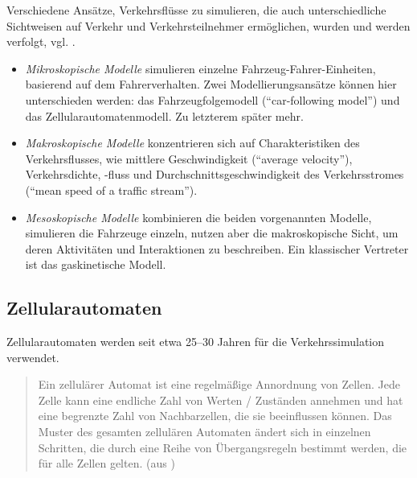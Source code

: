 Verschiedene Ansätze, Verkehrsflüsse zu simulieren, die auch unterschiedliche Sichtweisen auf Verkehr und Verkehrsteilnehmer ermöglichen, %
wurden und werden verfolgt, vgl. \cite{dingding}.
\begin{itemize}
	\item \textit{Mikroskopische Modelle} simulieren einzelne Fahrzeug-Fahrer-Einheiten, basierend auf dem Fahrerverhalten. Zwei Modellierungsansätze können hier unterschieden werden: das Fahrzeugfolgemodell (\enquote{car-following model}) und das Zellularautomatenmodell. Zu letzterem später mehr.
	\item \textit{Makroskopische Modelle}  konzentrieren sich auf Charakteristiken des Verkehrsflusses, wie mittlere Geschwindigkeit (\enquote{average velocity}), Verkehrsdichte, -fluss und Durchschnittsgeschwindigkeit des Verkehrsstromes (\enquote{mean speed of a traffic stream}).
	\item \textit{Mesoskopische Modelle} kombinieren die beiden vorgenannten Modelle, simulieren die Fahrzeuge einzeln, nutzen aber die makroskopische Sicht, um deren Aktivitäten und Interaktionen zu beschreiben. Ein klassischer Vertreter ist das gaskinetische Modell.
\end{itemize}






\subsection{Zellularautomaten}
\label{sec:ca}

Zellularautomaten werden seit etwa 25--30 Jahren für die Verkehrssimulation verwendet.

\begin{quote}
Ein zellulärer Automat ist eine regelmäßige Annordnung von Zellen. Jede Zelle kann eine endliche Zahl von Werten / Zuständen annehmen und hat eine  begrenzte Zahl von Nachbarzellen, die sie beeinflussen können. Das Muster des gesamten zellulären Automaten ändert sich in einzelnen Schritten, die durch eine Reihe von Übergangsregeln bestimmt werden, die für alle Zellen gelten. (aus \cite{cell-autom})
\end{quote} 

